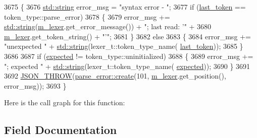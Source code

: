 \begin{DoxyCode}
3675     \{
3676         \hyperlink{namespacenlohmann_1_1detail_a1ed8fc6239da25abcaf681d30ace4985ab45cffe084dd3d20d928bee85e7b0f21}{std::string} error\_msg = \textcolor{stringliteral}{"syntax error - "};
3677         \textcolor{keywordflow}{if} (\hyperlink{classnlohmann_1_1detail_1_1parser_a932e49f6f4d291557846744319245994}{last\_token} == token\_type::parse\_error)
3678         \{
3679             error\_msg += \hyperlink{namespacenlohmann_1_1detail_a1ed8fc6239da25abcaf681d30ace4985ab45cffe084dd3d20d928bee85e7b0f21}{std::string}(\hyperlink{classnlohmann_1_1detail_1_1parser_a22dcc815551a4052b87797b34171b352}{m\_lexer}.get\_error\_message()) + \textcolor{stringliteral}{"; last read: '"} +
3680                          \hyperlink{classnlohmann_1_1detail_1_1parser_a22dcc815551a4052b87797b34171b352}{m\_lexer}.get\_token\_string() + \textcolor{stringliteral}{"'"};
3681         \}
3682         \textcolor{keywordflow}{else}
3683         \{
3684             error\_msg += \textcolor{stringliteral}{"unexpected "} + \hyperlink{namespacenlohmann_1_1detail_a1ed8fc6239da25abcaf681d30ace4985ab45cffe084dd3d20d928bee85e7b0f21}{std::string}(lexer\_t::token\_type\_name(
      \hyperlink{classnlohmann_1_1detail_1_1parser_a932e49f6f4d291557846744319245994}{last\_token}));
3685         \}
3686 
3687         \textcolor{keywordflow}{if} (\hyperlink{classnlohmann_1_1detail_1_1parser_ad055620d886819b26dabc1dfb80c7fb7}{expected} != token\_type::uninitialized)
3688         \{
3689             error\_msg += \textcolor{stringliteral}{"; expected "} + \hyperlink{namespacenlohmann_1_1detail_a1ed8fc6239da25abcaf681d30ace4985ab45cffe084dd3d20d928bee85e7b0f21}{std::string}(lexer\_t::token\_type\_name(
      \hyperlink{classnlohmann_1_1detail_1_1parser_ad055620d886819b26dabc1dfb80c7fb7}{expected}));
3690         \}
3691 
3692         \hyperlink{json_8hpp_a6c274f6db2e65c1b66c7d41b06ad690f}{JSON\_THROW}(\hyperlink{classnlohmann_1_1detail_1_1parse__error_a9fd60ad6bce80fd99686ad332faefd37}{parse\_error::create}(101, \hyperlink{classnlohmann_1_1detail_1_1parser_a22dcc815551a4052b87797b34171b352}{m\_lexer}.get\_position(), 
      error\_msg));
3693     \}
\end{DoxyCode}
Here is the call graph for this function\+:


\subsection{Field Documentation}
\mbox{\label{classnlohmann_1_1detail_1_1parser_a3de1ea054cfa606e79fa07741f081b5f}} 
